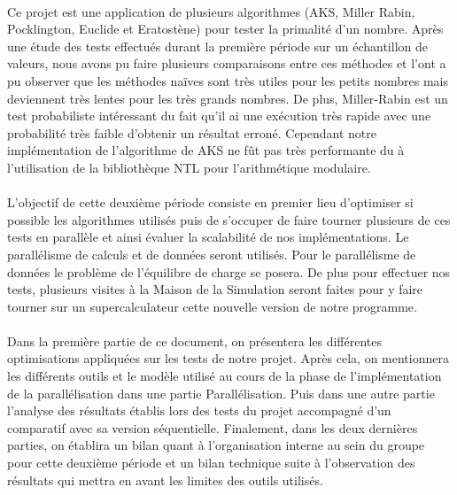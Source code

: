	\paragraph{}Ce projet est une application de plusieurs algorithmes (AKS, Miller Rabin, Pocklington, Euclide et Eratostène) pour tester la primalité d'un nombre. Après une étude des tests effectués durant la première période sur un échantillon de valeurs, nous avons pu faire plusieurs comparaisons entre ces méthodes et l'ont a pu observer que les méthodes naïves sont très utiles pour les petits nombres mais deviennent très lentes pour les très grands nombres. De plus, Miller-Rabin est un test probabiliste intéressant du fait qu'il ai une exécution très rapide avec une probabilité très faible d'obtenir un résultat erroné. Cependant notre implémentation de l'algorithme de AKS ne fût pas très performante du à l'utilisation de la bibliothèque NTL pour l'arithmétique modulaire.
	
	\paragraph{}L'objectif de cette deuxième période consiste en premier lieu d'optimiser si possible les algorithmes utilisés puis de s’occuper de faire tourner plusieurs de ces tests en parallèle et ainsi évaluer la scalabilité de nos implémentations. Le parallélisme de calculs et de données seront utilisés. Pour le parallélisme de données le problème de l'équilibre de charge se posera. De plus pour effectuer nos tests, plusieurs visites à la Maison de la Simulation seront faites pour y faire tourner sur un supercalculateur cette nouvelle version de notre programme. 
	
	\paragraph{}Dans la première partie de ce document, on présentera les différentes optimisations appliquées sur les tests de notre projet.
	Après cela, on mentionnera les différents outils et le modèle utilisé au cours de la phase de l'implémentation de la parallélisation dans une partie Parallélisation. Puis dans une autre partie l'analyse des résultats établis lors des tests du projet accompagné d'un comparatif avec sa version séquentielle.
	Finalement, dans les deux dernières parties, on établira un bilan quant à l'organisation interne au sein du groupe pour cette deuxième période et un bilan technique suite à l'observation des résultats qui mettra en avant les limites des outils utilisés.
	

